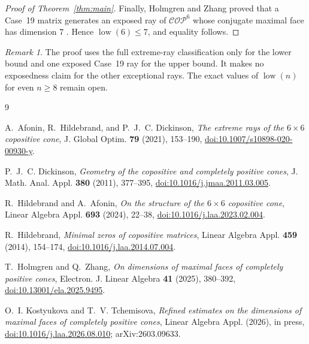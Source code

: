 \documentclass[11pt]{amsart}
\theoremstyle{remark}
\newtheorem{remark}[theorem]{Remark}
\newcommand{\COP}{\mathcal{COP}}
\newcommand{\low}{\operatorname{low}}
\newcommand{\doi}[1]{\href{https://doi.org/#1}{doi:#1}}
\begin{document}
\begin{proof}[Proof of Theorem~\ref{thm:main}]
Finally, Holmgren and Zhang proved that a Case~19 matrix generates an
exposed ray of $\COP^6$ whose conjugate maximal face has dimension $7$
\cite[Lemma~4.7 and Theorem~4.8]{HZ}. Hence $\low(6)\le7$, and equality
follows.
\end{proof}

\begin{remark}
The proof uses the full extreme-ray classification only for the lower bound
and one exposed Case~19 ray for the upper bound. It makes no exposedness
claim for the other exceptional rays. The exact values of $\low(n)$ for
even $n\ge8$ remain open.
\end{remark}

\begin{thebibliography}{9}

A.~Afonin, R.~Hildebrand, and P.~J.~C. Dickinson,
\emph{The extreme rays of the $6\times6$ copositive cone},
J. Global Optim. \textbf{79} (2021), 153--190,
\doi{10.1007/s10898-020-00930-y}.

P.~J.~C. Dickinson,
\emph{Geometry of the copositive and completely positive cones},
J. Math. Anal. Appl. \textbf{380} (2011), 377--395,
\doi{10.1016/j.jmaa.2011.03.005}.

R.~Hildebrand and A.~Afonin,
\emph{On the structure of the $6\times6$ copositive cone},
Linear Algebra Appl. \textbf{693} (2024), 22--38,
\doi{10.1016/j.laa.2023.02.004}.

R.~Hildebrand,
\emph{Minimal zeros of copositive matrices},
Linear Algebra Appl. \textbf{459} (2014), 154--174,
\doi{10.1016/j.laa.2014.07.004}.

T.~Holmgren and Q.~Zhang,
\emph{On dimensions of maximal faces of completely positive cones},
Electron. J. Linear Algebra \textbf{41} (2025), 380--392,
\doi{10.13001/ela.2025.9495}.

O.~I. Kostyukova and T.~V. Tchemisova,
\emph{Refined estimates on the dimensions of maximal faces of completely
positive cones},
Linear Algebra Appl. (2026), in press,
\doi{10.1016/j.laa.2026.08.010}; arXiv:2603.09633.

\end{thebibliography}
\end{document}
